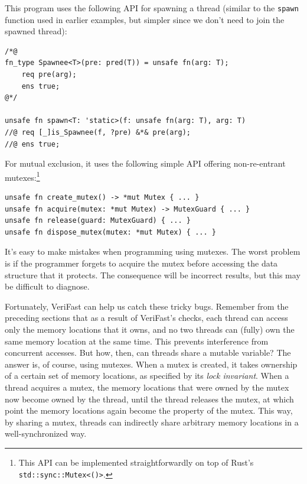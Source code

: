\documentclass{article}
\begin{document}
This program uses the following API for spawning a thread (similar to the \lstinline|spawn| function
used in earlier examples, but simpler since we don't need to join the spawned thread):
\begin{lstlisting}
/*@
fn_type Spawnee<T>(pre: pred(T)) = unsafe fn(arg: T);
    req pre(arg);
    ens true;
@*/

unsafe fn spawn<T: 'static>(f: unsafe fn(arg: T), arg: T)
//@ req [_]is_Spawnee(f, ?pre) &*& pre(arg);
//@ ens true;
\end{lstlisting}

For mutual exclusion, it uses the following simple API offering non-re-entrant mutexes:\footnote{This API can be implemented straightforwardly on top of Rust's \lstinline|std::sync::Mutex<()>|.}
\begin{lstlisting}
unsafe fn create_mutex() -> *mut Mutex { ... }
unsafe fn acquire(mutex: *mut Mutex) -> MutexGuard { ... }
unsafe fn release(guard: MutexGuard) { ... }
unsafe fn dispose_mutex(mutex: *mut Mutex) { ... }
\end{lstlisting}

It's easy to make mistakes when programming using mutexes. The
worst problem is if the programmer forgets to acquire the mutex
before accessing the data structure that it protects. The
consequence will be incorrect results, but this may be
difficult to diagnose.

Fortunately, VeriFast can help us catch these tricky bugs.
Remember from the preceding sections that as a result of
VeriFast's checks, each thread can access only the memory
locations that it owns, and no two threads can (fully) own the
same memory location at the same time. This prevents
interference from concurrent accesses. But how, then, can
threads share a mutable variable? The answer is, of course,
using mutexes. When a mutex is created, it takes ownership of a
certain set of memory locations, as specified by its \emph{lock
invariant}. When a thread acquires a mutex, the memory
locations that were owned by the mutex now become owned by the
thread, until the thread releases the mutex, at which point the
memory locations again become the property of the mutex. This
way, by sharing a mutex, threads can indirectly share arbitrary
memory locations in a well-synchronized way.
\end{document}
